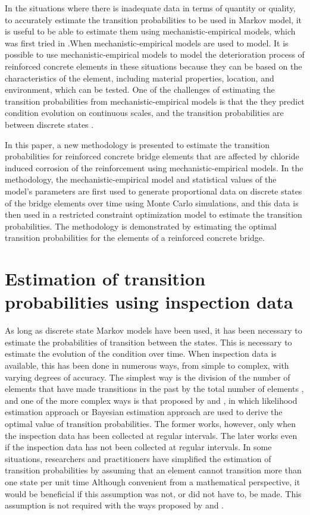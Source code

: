 \documentclass[Journal]{ascelike}
\begin{document}
In the situations where there is inadequate data in terms of quantity
or quality, to accurately estimate the transition probabilities to
be used in Markov model, it is useful to be able to estimate them
using mechanistic-empirical models, which was first tried in \cite{Roelfstra2004}.When
mechanistic-empirical models are used to model. It is possible to use
mechanistic-empirical models to model the deterioration process of
reinforced concrete elements in these situations because they can
be based on the characteristics of the element, including material
properties, location, and environment, which can be tested. One of
the challenges of estimating the transition probabilities from mechanistic-empirical
models is that the they predict condition evolution on continuous
scales, and the transition probabilities are between discrete states
\cite{DuraCrete1998}.

In this paper, a new methodology is presented to estimate the transition
probabilities for reinforced concrete bridge elements that are affected
by chloride induced corrosion of the reinforcement using mechanistic-empirical
models. In the methodology, the mechanistic-empirical model and statistical
values of the model's parameters are first used to generate proportional
data on discrete states of the bridge elements over time using Monte
Carlo simulations, and this data is then used in a restricted constraint
optimization model to estimate the transition probabilities. The methodology
is demonstrated by estimating the optimal transition probabilities
for the elements of a reinforced concrete bridge.

\section{Estimation of transition probabilities using inspection data}
\label{mdpd} 

As long as discrete state Markov models have been used, it has been
necessary to estimate the probabilities of transition between the
states. This is necessary to estimate the evolution of the condition
over time. When inspection data is available, this has been done in
numerous ways, from simple to complex, with varying degrees of accuracy.
The simplest way is the division of the number of elements that have
made transitions in the past by the total number of elements \cite{Tsuda2006},
and one of the more complex ways is that proposed by 
and , in which likelihood estimation approach
or Bayesian estimation approach are used to derive the optimal value
of transition probabilities. The former works, however, only when
the inspection data has been collected at regular intervals. The later
works even if the inspection data has not been collected at regular
intervals. In some situations, researchers and practitioners have
simplified the estimation of transition probabilities by assuming
that an element cannot transition more than one state per unit time\cite{Jiang1988,Al-Subhi1989,Mishalani2002,Robelin2007} Although convenient from a mathematical perspective, it would be beneficial
if this assumption was not, or did not have to, be made. This assumption
is not required with the ways proposed by  and .
\end{document}
